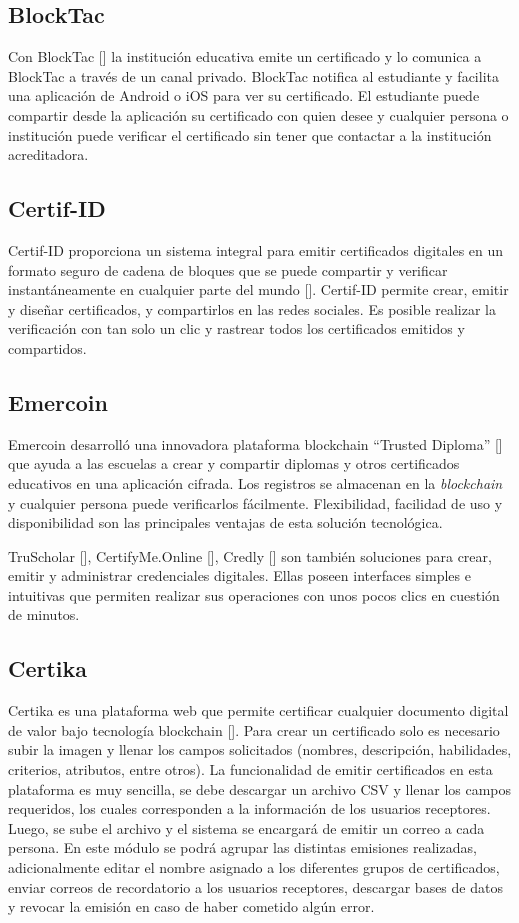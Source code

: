 \subsection{BlockTac}
Con BlockTac [\cite{83}] la institución educativa emite un certificado y lo comunica a BlockTac a través de un canal privado. BlockTac notifica al estudiante y facilita una aplicación de Android o iOS para ver su certificado. El estudiante puede compartir desde la aplicación su certificado con quien desee y cualquier persona o institución puede verificar el certificado sin tener que contactar a la institución acreditadora.

\subsection{Certif-ID}
Certif-ID proporciona un sistema integral para emitir certificados digitales en un formato seguro de cadena de bloques que se puede compartir y verificar instantáneamente en cualquier parte del mundo [\cite{84}]. Certif-ID permite crear, emitir y diseñar certificados, y compartirlos en las redes sociales. Es posible realizar la verificación con tan solo un clic y  rastrear todos los certificados emitidos y compartidos.

\subsection{Emercoin}
Emercoin desarrolló una innovadora plataforma blockchain ``Trusted Diploma'' [\cite{87}] que ayuda a las escuelas a crear y compartir diplomas y otros certificados educativos en una aplicación cifrada. Los registros se almacenan en la \textit{blockchain} y cualquier persona puede verificarlos fácilmente. Flexibilidad, facilidad de uso y disponibilidad son las principales ventajas de esta solución tecnológica.

TruScholar [\cite{86}], CertifyMe.Online [\cite{85}], Credly [\cite{89}] son también soluciones para crear, emitir y administrar credenciales digitales. Ellas poseen interfaces simples e intuitivas que permiten realizar sus operaciones con unos pocos clics en cuestión de minutos.

\subsection{Certika}
Certika es una plataforma web que permite certificar cualquier documento digital de valor bajo tecnología blockchain [\cite{88}]. Para crear un certificado solo es necesario subir la imagen y llenar los campos solicitados (nombres, descripción, habilidades, criterios, atributos, entre otros). La funcionalidad de emitir certificados en esta plataforma es muy sencilla, se debe descargar un archivo CSV y llenar los campos requeridos, los cuales corresponden a la información de los usuarios receptores. Luego, se sube el archivo y el sistema se encargará de emitir un correo a cada persona. En este módulo se podrá agrupar las distintas emisiones realizadas, adicionalmente editar el nombre asignado a los diferentes grupos de certificados, enviar correos de recordatorio a los usuarios receptores, descargar bases de datos y revocar la emisión en caso de haber cometido algún error.

